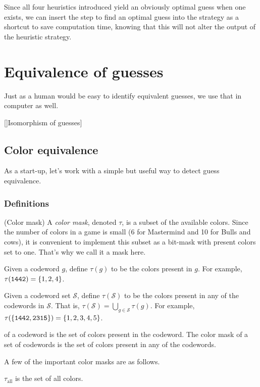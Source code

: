 Since all four heuristics introduced yield an obviously optimal guess when one exists, we can insert the step to find an optimal guess into the strategy as a shortcut to save computation time, knowing that this will not alter the output of the heuristic strategy.

\section{Equivalence of guesses}

Just as a human would be easy to identify equivalent guesses, we use that in computer as well.

[]Isomorphism of guesses]

\subsection{Color equivalence}

As a start-up, let's work with a simple but useful way to detect guess equivalence.

\subsubsection{Definitions}

\begin{definition}
(Color mask) A \emph{color mask}, denoted $\tau$, is a subset of the available colors. Since the number of colors in a game is small (6 for Mastermind and 10 for Bulls and cows), it is convenient to implement this subset as a bit-mask with present colors set to one. That's why we call it a mask here.
\end{definition}

Given a codeword $g$, define $\tau(g)$ to be the colors present in $g$. For example, $\tau(\texttt{1442}) = \{1, 2, 4\}$. 

Given a codeword set $\mathcal{S}$, define $\tau(\mathcal{S})$ to be the colors present in any of the codewords in $\mathcal{S}$. That is, $\tau(\mathcal{S}) = \bigcup_{g \in \mathcal{S}} \tau(g)$. For example, $\tau(\{\texttt{1442},\texttt{2315} \}) = \{ 1, 2, 3, 4, 5\}$.

of a codeword is the set of colors present in the codeword. The color mask of a set of codewords is the set of colors present in any of the codewords.

A few of the important color masks are as follows.

$\tau_{\text{all}}$ is the set of all colors.

